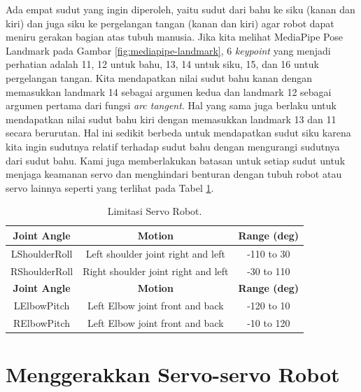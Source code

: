 Ada empat sudut yang ingin diperoleh, yaitu sudut dari bahu ke siku (kanan dan kiri) dan juga siku ke pergelangan tangan (kanan dan kiri) agar robot dapat meniru gerakan bagian atas tubuh manusia.
Jika kita melihat MediaPipe Pose Landmark pada Gambar \ref{fig:mediapipe-landmark}, 6 \textit{keypoint} yang menjadi perhatian adalah 11, 12 untuk bahu, 13, 14 untuk siku, 15, dan 16 untuk pergelangan tangan.
Kita mendapatkan nilai sudut bahu kanan dengan memasukkan landmark 14 sebagai argumen kedua dan landmark 12 sebagai argumen pertama dari fungsi \emph{arc tangent}. Hal yang sama juga berlaku untuk mendapatkan nilai sudut bahu kiri dengan memasukkan landmark 13 dan 11 secara berurutan.
Hal ini sedikit berbeda untuk mendapatkan sudut siku karena kita ingin sudutnya relatif terhadap sudut bahu dengan mengurangi sudutnya dari sudut bahu.
Kami juga memberlakukan batasan untuk setiap sudut untuk menjaga keamanan servo dan menghindari benturan dengan tubuh robot atau servo lainnya seperti yang terlihat pada Tabel \ref{tb:robot-servos}.
\begin{longtable}{ccc}
  \caption{Limitasi Servo Robot.}
  \label{tb:robot-servos}\\
  \hline
  \rowcolor[HTML]{C0C0C0}
  \textbf{Joint Angle} & \textbf{Motion} & \textbf{Range (deg)} \\
  \hline
  LShoulderRoll       & Left shoulder joint right and left    & -110 to 30  \\
  RShoulderRoll       & Right shoulder joint right and left   & -30 to 110 \\
  \rowcolor[HTML]{C0C0C0}
  \textbf{Joint Angle} & \textbf{Motion} & \textbf{Range (deg)} \\
  \hline
  LElbowPitch           & Left Elbow joint front and back       & -120 to 10  \\
  RElbowPitch           & Left Elbow joint front and back       & -10 to 120  \\
  \hline
\end{longtable}


\section{Menggerakkan Servo-servo Robot}
\label{sec:move-robot-servo}

